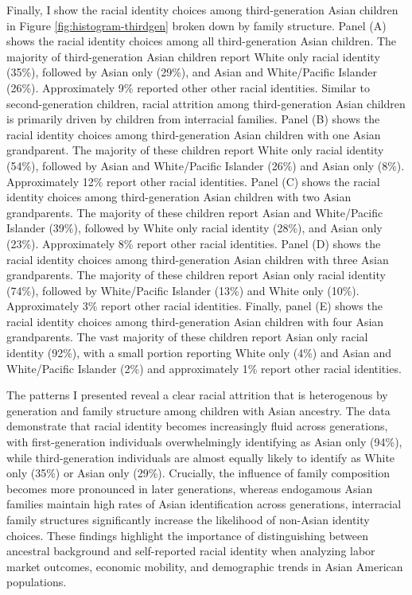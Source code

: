 Finally, I show the racial identity choices among third-generation Asian children in Figure \ref{fig:histogram-thirdgen} broken down by family structure. Panel (A) shows the racial identity choices among all third-generation Asian children. The majority of third-generation Asian children report White only racial identity (35\%), followed by Asian only (29\%), and Asian and White/Pacific Islander (26\%). Approximately 9\% reported other other racial identities. Similar to second-generation children, racial attrition among third-generation Asian children is primarily driven by children from interracial families. Panel (B) shows the racial identity choices among third-generation Asian children with one Asian grandparent. The majority of these children report White only racial identity (54\%), followed by Asian and White/Pacific Islander (26\%) and Asian only (8\%). Approximately 12\% report other racial identities. Panel (C) shows the racial identity choices among third-generation Asian children with two Asian grandparents. The majority of these children report Asian and White/Pacific Islander (39\%), followed by White only racial identity (28\%), and Asian only (23\%). Approximately 8\% report other racial identities. Panel (D) shows the racial identity choices among third-generation Asian children with three Asian grandparents. The majority of these children report Asian only racial identity (74\%), followed by White/Pacific Islander (13\%) and White only (10\%). Approximately 3\% report other racial identities. Finally, panel (E) shows the racial identity choices among third-generation Asian children with four Asian grandparents. The vast majority of these children report Asian only racial identity (92\%), with a small portion reporting White only (4\%) and Asian and White/Pacific Islander (2\%) and approximately 1\% report other racial identities.

The patterns I presented reveal a clear racial attrition that is heterogenous by generation and family structure among children with Asian ancestry. The data demonstrate that racial identity becomes increasingly fluid across generations, with first-generation individuals overwhelmingly identifying as Asian only (94\%), while third-generation individuals are almost equally likely to identify as White only (35\%) or Asian only (29\%). Crucially, the influence of family composition becomes more pronounced in later generations, whereas endogamous Asian families maintain high rates of Asian identification across generations, interracial family structures significantly increase the likelihood of non-Asian identity choices. These findings highlight the importance of distinguishing between ancestral background and self-reported racial identity when analyzing labor market outcomes, economic mobility, and demographic trends in Asian American populations.


